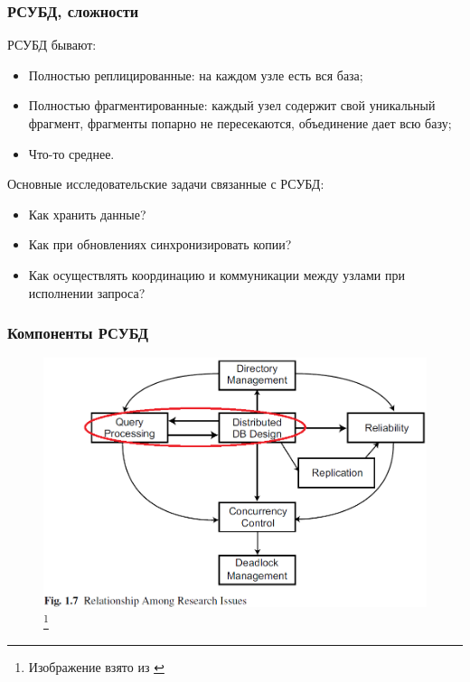 \documentclass{beamer}
\begin{document}
\begin{frame}
\frametitle{РСУБД, сложности}

РСУБД бывают:
\begin{itemize}
  \item Полностью реплицированные: на каждом узле есть вся база;
  \item Полностью фрагментированные: каждый узел содержит свой уникальный фрагмент, фрагменты попарно не пересекаются, объединение дает всю базу;
  \item Что-то среднее.
\end{itemize}

Основные исследовательские задачи связанные с РСУБД:
\begin{itemize}
  \item Как хранить данные?
  \item Как при обновлениях синхронизировать копии?
  \item Как осуществлять координацию и коммуникации между узлами при исполнении запроса?
\end{itemize}

\end{frame}

\begin{frame}
\frametitle{Компоненты РСУБД}

\begin{figure}[htb]
\includegraphics[width=\textwidth,height=0.80\textheight,keepaspectratio]{ozsu-3.png} 
\footnote{\tiny{Изображение взято из \cite{Ozsu2011}}}
\end{figure}

\end{frame}
\end{document}
